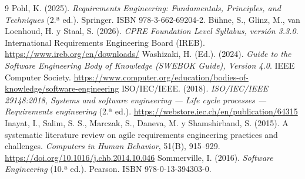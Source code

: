 \documentclass[12pt,a4paper]{article}
\begin{document}
\begin{thebibliography}{9}
 Pohl, K. (2025). \emph{Requirements Engineering: Fundamentals, Principles, and Techniques} (2.ª ed.). Springer. ISBN 978-3-662-69204-2.
 Bühne, S., Glinz, M., van Loenhoud, H. y Staal, S. (2026). \emph{CPRE Foundation Level Syllabus, versión 3.3.0}. International Requirements Engineering Board (IREB). \url{https://www.ireb.org/en/downloads/}
 Washizaki, H. (Ed.). (2024). \emph{Guide to the Software Engineering Body of Knowledge (SWEBOK Guide), Version 4.0}. IEEE Computer Society. \url{https://www.computer.org/education/bodies-of-knowledge/software-engineering}
 ISO/IEC/IEEE. (2018). \emph{ISO/IEC/IEEE 29148:2018, Systems and software engineering — Life cycle processes — Requirements engineering} (2.ª ed.). \url{https://webstore.iec.ch/en/publication/64315}
 Inayat, I., Salim, S. S., Marczak, S., Daneva, M. y Shamshirband, S. (2015). A systematic literature review on agile requirements engineering practices and challenges. \emph{Computers in Human Behavior}, 51(B), 915--929. \url{https://doi.org/10.1016/j.chb.2014.10.046}
 Sommerville, I. (2016). \emph{Software Engineering} (10.ª ed.). Pearson. ISBN 978-0-13-394303-0.
\end{thebibliography}
\end{document}
